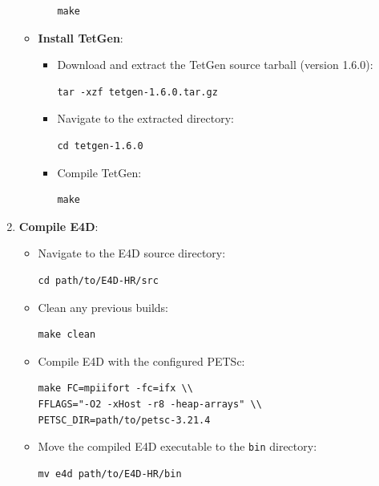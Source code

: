 \documentclass[a4paper,12pt]{article}
\begin{document}
\begin{enumerate}
\begin{itemize}
\begin{itemize}
                              \begin{verbatim}
make
                    \end{verbatim}
                    \end{itemize}
              \item \textbf{Install TetGen}:
                    \begin{itemize}
                        \item Download and extract the TetGen source tarball (version 1.6.0):
                              \begin{verbatim}
tar -xzf tetgen-1.6.0.tar.gz
                    \end{verbatim}
                        \item Navigate to the extracted directory:
                              \begin{verbatim}
cd tetgen-1.6.0
                    \end{verbatim}
                        \item Compile TetGen:
                              \begin{verbatim}
make
                    \end{verbatim}
                    \end{itemize}
          \end{itemize}

    \item \textbf{Compile E4D}:
          \begin{itemize}
              \item Navigate to the E4D source directory:
                    \begin{verbatim}
cd path/to/E4D-HR/src
            \end{verbatim}
              \item Clean any previous builds:
                    \begin{verbatim}
make clean
            \end{verbatim}
              \item Compile E4D with the configured PETSc:
                    \begin{verbatim}
make FC=mpiifort -fc=ifx \\
FFLAGS="-O2 -xHost -r8 -heap-arrays" \\
PETSC_DIR=path/to/petsc-3.21.4
            \end{verbatim}
              \item Move the compiled E4D executable to the \texttt{bin} directory:
                    \begin{verbatim}
mv e4d path/to/E4D-HR/bin
            \end{verbatim}
          \end{itemize}
\end{enumerate}
\end{document}
